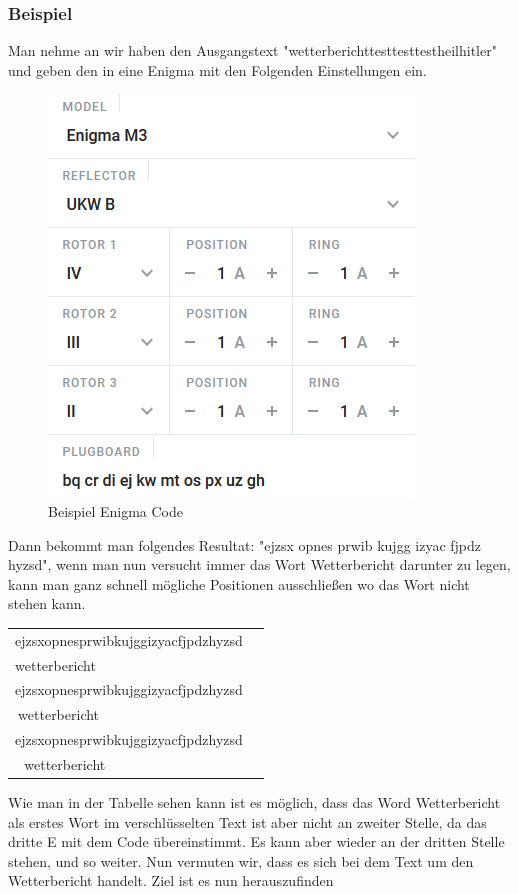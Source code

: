 \subsubsection{Beispiel}
Man nehme an wir haben den Ausgangstext "wetterberichttesttesttestheilhitler" und geben den in eine Enigma mit den Folgenden Einstellungen ein. \begin{figure}
\includegraphics[scale=0.5]{codegen.png}
\caption{Beispiel Enigma Code\cite{encoding}}
\label{fig:ecode}
\end{figure}
Dann bekommt man folgendes Resultat: "ejzsx opnes prwib kujgg izyac fjpdz hyzsd", wenn man nun versucht immer das Wort Wetterbericht darunter zu legen, kann man ganz schnell mögliche Positionen ausschließen wo das Wort nicht stehen kann.
\begin{table}[H]
\begin{tabular}{|l|l|}
\hline
ejzsxopnesprwibkujggizyacfjpdzhyzsd\\
wetterbericht\\
\hline
ejzsxopnesprwibkujggizyacfjpdzhyzsd\\
$\:$wetterbericht\\
\hline
ejzsxopnesprwibkujggizyacfjpdzhyzsd\\
$\:\:\:$wetterbericht\\
\hline
\end{tabular}
\end{table}
Wie man in der Tabelle sehen kann ist es möglich, dass das Word Wetterbericht als erstes Wort im verschlüsselten Text ist aber nicht an zweiter Stelle, da das dritte E mit dem Code übereinstimmt. Es kann aber wieder an der dritten Stelle stehen, und so weiter. Nun vermuten wir, dass es sich bei dem Text um den Wetterbericht handelt. Ziel ist es nun herauszufinden